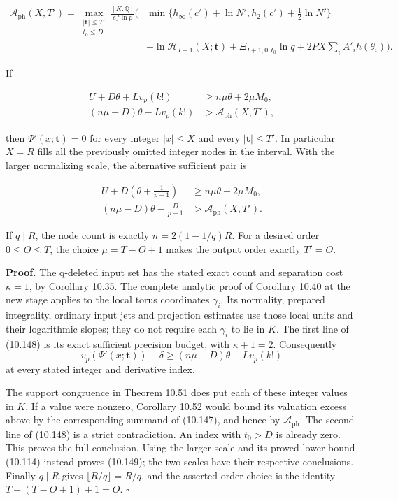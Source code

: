 \documentclass[
  11pt,
  a4paper,
]{article}
\begin{document}
\[
\begin{aligned}
\mathcal A_{\mathrm{ph}}(X,T')=
\max_{\substack{|\boldsymbol t|\le T'\\t_0\le D}}
\frac{[K:\mathbb Q]}{ef\ln p}\biggl(&
\min\{h_\infty(c')+\ln N',h_2(c')+\tfrac12\ln N'\}\\
&+\ln\mathcal H_{I+1}(X;\boldsymbol t)
+\Xi_{I+1,0,t_0}\ln q
+2PX\sum_iA'_ih(\theta_i)\biggr).
\end{aligned}
\tag{10.147}
\]

If

\[
\begin{aligned}
U+D\theta+Lv_p(k!)&\ge n\mu\theta+2\mu M_0,\\
(n\mu-D)\theta-Lv_p(k!)&>\mathcal A_{\mathrm{ph}}(X,T'),
\end{aligned}
\tag{10.148}
\]

then \(\Psi'(x;\boldsymbol t)=0\) for every integer \(|x|\le X\) and
every \(|\boldsymbol t|\le T'\). In particular \(X=R\) fills all the
previously omitted integer nodes in the interval. With the larger
normalizing scale, the alternative sufficient pair is

\[
\begin{aligned}
U+D\left(\theta+\frac1{p-1}\right)&\ge n\mu\theta+2\mu M_0,\\
(n\mu-D)\theta-\frac D{p-1}&>\mathcal A_{\mathrm{ph}}(X,T').
\end{aligned}
\tag{10.149}
\]

If \(q\mid R\), the node count is exactly \(n=2(1-1/q)R\). For a desired
order \(0\le O\le T\), the choice \(\mu=T-O+1\) makes the output order
exactly \(T'=O\).

\textbf{Proof.} The q-deleted input set has the stated exact count and
separation cost \(\kappa=1\), by Corollary 10.35. The complete analytic
proof of Corollary 10.40 at the new stage applies to the local torus
coordinates \(\gamma_i\). Its normality, prepared integrality, ordinary
input jets and projection estimates use those local units and their
logarithmic slopes; they do not require each \(\gamma_i\) to lie in
\(K\). The first line of (10.148) is its exact sufficient precision
budget, with \(\kappa+1=2\). Consequently \[
v_p(\Psi'(x;\boldsymbol t))-\delta
\ge(n\mu-D)\theta-Lv_p(k!)
\] at every stated integer and derivative index.

The support congruence in Theorem 10.51 does put each of these integer
values in \(K\). If a value were nonzero, Corollary 10.52 would bound
its valuation excess above by the corresponding summand of (10.147), and
hence by \(\mathcal A_{\mathrm{ph}}\). The second line of (10.148) is a
strict contradiction. An index with \(t_0>D\) is already zero. This
proves the full conclusion. Using the larger scale and its proved lower
bound (10.114) instead proves (10.149); the two scales have their
respective conclusions. Finally \(q\mid R\) gives
\(\lfloor R/q\rfloor=R/q\), and the asserted order choice is the
identity \(T-(T-O+1)+1=O\). \(\square\)
\end{document}
